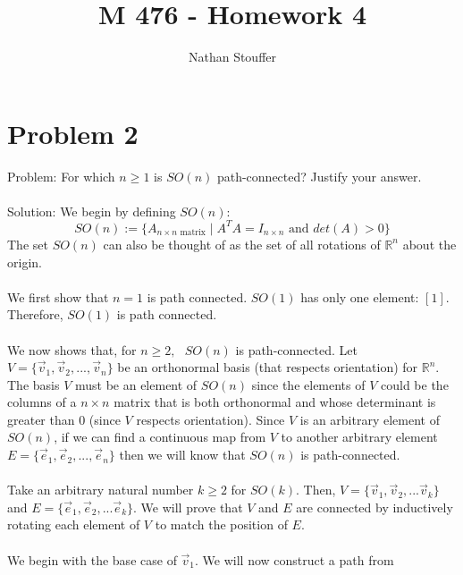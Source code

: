 \documentclass{article}
\begin{document}
\title{M 476 - Homework 4}
\author{Nathan Stouffer}

\maketitle
\newpage


\section*{Problem 2}
Problem: For which
$n \geq 1$ is $SO(n)$
path-connected? Justify your answer. \\\\
Solution: We begin by defining
$SO(n)$:
$$SO(n) := \{ A_{n \times n \text{ matrix}} \mid A^T A = I_{n \times n} \text{ and } det(A) > 0 \}$$
The set
$SO(n)$
can also be thought of as the set of all rotations of
$\mathbb{R}^n$
about the origin. \\\\
We first show that
$n = 1$ is path connected.
$SO(1)$
has only one element: 
$[1]$.
Therefore,
$SO(1)$
is path connected. \\\\
We now shows that, for 
$n \geq 2, \text{ } SO(n)$
is path-connected. Let 
$ V = \{ \vec{v}_1 , \vec{v}_2, ..., \vec{v}_n \}$
be an orthonormal basis (that respects orientation) for 
$\mathbb{R}^n$.
The basis
$V$
must be an element of
$SO(n)$
since the elements of 
$V$
could be the columns of a
$n \times n$
matrix that is both orthonormal and whose determinant is greater than 0 (since 
$V$
respects orientation).
Since
$V$
is an arbitrary element of 
$SO(n)$,
if we can find a continuous map from 
$V$
to another arbitrary element
$E = \{ \vec{e}_1 , \vec{e}_2, ..., \vec{e}_n \}$
then we will know that
$SO(n)$
is path-connected. \\\\
Take an arbitrary natural number 
$k \geq 2$
for
$SO(k)$.
Then, 
$V = \{ \vec{v}_1, \vec{v}_2, ... \vec{v}_k \}$
and
$E = \{ \vec{e}_1, \vec{e}_2, ... \vec{e}_k \}$.
We will prove that
$V$
and
$E$
are connected by inductively rotating each element of 
$V$
to match the position of
$E$. \\\\
We begin with the base case of
$\vec{v}_1$. We will now construct a path from
\end{document}
